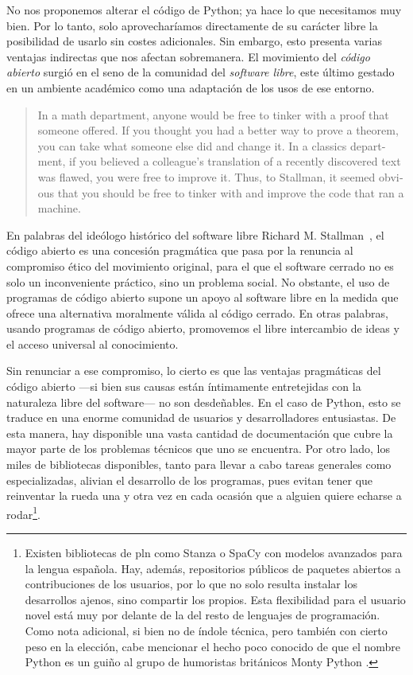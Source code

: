 No nos proponemos alterar el código de Python; ya hace lo que necesitamos muy bien. Por lo tanto, solo aprovecharíamos directamente de su carácter libre la posibilidad de usarlo sin costes adicionales. Sin embargo, esto presenta varias ventajas indirectas que nos afectan sobremanera. El movimiento del \textit{código abierto}  surgió en el seno de la comunidad del \textit{software libre}, este último gestado en un ambiente académico  como una adaptación de los usos de ese entorno.
\blockquote{\begin{english}In a math department, anyone would be free to tinker with a proof that someone offered. If you thought you had a better way to prove a theorem, you can take what someone else did and change it. In a classics department, if you believed a colleague's translation of a recently discovered text was flawed, you were free to improve it. Thus, to Stallman, it seemed obvious that you should be free to tinker with and improve the code that ran a machine.\end{english} \parencite[279]{lessig2004}}
En palabras del ideólogo histórico del software libre Richard M. Stallman~\parencite*[57-62]{stallman2002}, el código abierto es una concesión pragmática que pasa por la renuncia al compromiso ético del movimiento original, para el que el software cerrado no es solo un inconveniente práctico, sino un problema social. No obstante, el uso de programas de código abierto supone un apoyo al software libre en la medida que ofrece una alternativa moralmente válida al código cerrado. En otras palabras, usando programas de código abierto, promovemos el libre intercambio de ideas y el acceso universal al conocimiento.

Sin renunciar a ese compromiso, lo cierto es que las ventajas pragmáticas del código abierto —si bien sus causas están íntimamente entretejidas con la naturaleza libre del software— no son desdeñables. En el caso de Python, esto se traduce en una enorme comunidad de usuarios y desarrolladores entusiastas. De esta manera, hay disponible una vasta cantidad de documentación que cubre la mayor parte de los problemas técnicos que uno se encuentra. Por otro lado, los miles de bibliotecas disponibles, tanto para llevar a cabo tareas generales como especializadas, alivian el desarrollo de los programas, pues evitan tener que reinventar la rueda una y otra vez en cada ocasión que a alguien quiere echarse a rodar\footnote{Existen bibliotecas de \ac{pln} como Stanza \parencite{qi2020} o SpaCy \parencite{explosion2023} con modelos avanzados para la lengua española. Hay, además, repositorios públicos de paquetes abiertos a contribuciones de los usuarios, por lo que no solo resulta instalar los desarrollos ajenos, sino compartir los propios. Esta flexibilidad para el usuario novel está muy por delante de la del resto de lenguajes de programación. Como nota adicional, si bien no de índole técnica, pero también con cierto peso en la elección, cabe mencionar el hecho poco conocido de que el nombre Python es un guiño al grupo de humoristas británicos Monty Python \parencite[20-21]{lutz2013}.}.

